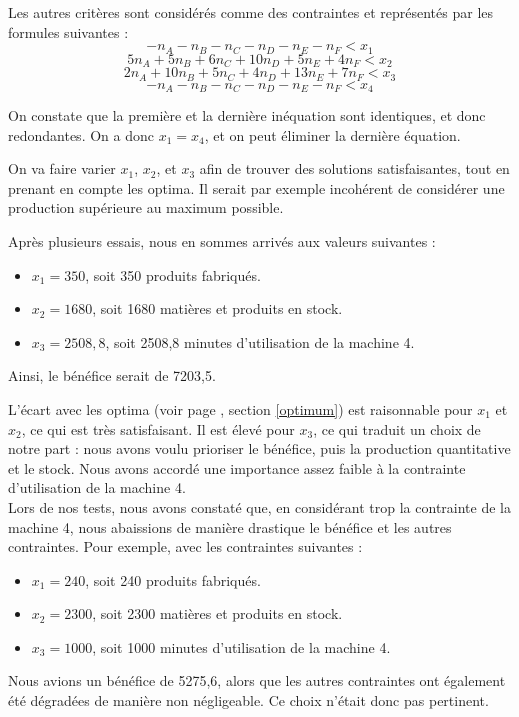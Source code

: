 \documentclass[a4paper,10pt]{article}
\begin{document}
Les autres critères sont considérés comme des contraintes et représentés par les formules suivantes :
$$ - n_A - n_B - n_C - n_D - n_E - n_F < x_1 $$
$$ 5n_A + 5n_B + 6n_C + 10n_D + 5n_E + 4n_F < x_2 $$
$$ 2n_A + 10n_B + 5n_C + 4n_D + 13n_E + 7n_F < x_3 $$
$$ - n_A - n_B - n_C - n_D - n_E - n_F < x_4 $$ 

On constate que la première et la dernière inéquation sont identiques, et donc redondantes. On a donc $x_1 = x_4$, et on peut éliminer la dernière équation.

On va faire varier $x_1$, $x_2$, et $x_3$ afin de trouver des solutions satisfaisantes, tout en prenant en compte les optima. Il serait par exemple incohérent de considérer une production supérieure au maximum possible.

Après plusieurs essais, nous en sommes arrivés aux valeurs suivantes :
\begin{itemize}
\item $x_1 = 350$, soit 350 produits fabriqués.
\item $x_2 = 1680$, soit 1680 matières et produits en stock.
\item $x_3 = 2508,8$, soit 2508,8 minutes d'utilisation de la machine 4.
\end{itemize}

Ainsi, le bénéfice serait de 7203,5.

L'écart avec les optima (voir page \pageref{optimum}, section \ref{optimum}) est raisonnable pour $x_1$ et $x_2$, ce qui est très satisfaisant. Il est élevé pour $x_3$, ce qui traduit un choix de notre part : nous avons voulu prioriser le bénéfice, puis la production quantitative et le stock. Nous avons accordé une importance assez faible à la contrainte d'utilisation de la machine 4.
\\

Lors de nos tests, nous avons constaté que, en considérant trop la contrainte de la machine 4, nous abaissions de manière drastique le bénéfice et les autres contraintes. Pour exemple, avec les contraintes suivantes :
\begin{itemize}
\item $x_1 = 240$, soit 240 produits fabriqués.
\item $x_2 = 2300$, soit 2300 matières et produits en stock.
\item $x_3 = 1000$, soit 1000 minutes d'utilisation de la machine 4.
\end{itemize}
Nous avions un bénéfice de 5275,6, alors que les autres contraintes ont également été dégradées de manière non négligeable. Ce choix n'était donc pas pertinent.
\end{document}
